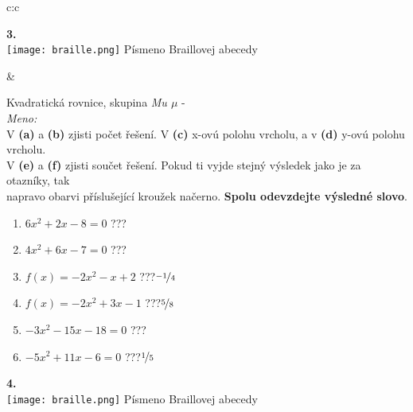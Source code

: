 \documentclass[10pt]{report}
\begin{document}
\begin{tabular}{c:c}
\begin{minipage}[c][99mm][t]{0.49\linewidth}
\begin{center}
\begin{minipage}{0.20\linewidth}
\begin{center}
{\Huge\bfseries 3.} \\[2mm]
\texttt{[image: braille.png]}
{\small Písmeno Braillovej abecedy}
\end{center}
\end{minipage}
\end{center}
\end{minipage}
&
\begin{minipage}[c][99mm][t]{0.49\linewidth}
\begin{center}
\vspace{7mm}
{\huge Kvadratická rovnice, skupina \textit{Mu $\mu$} -}\\[4.5mm]
\textit{Meno:}\phantom{xxxxxxxxxxxxxxxxxxxxxxxxxxxxxxxxxxxxxxxxxxxxxxxxxxxxxxxxxxxxxxxxx}\\[3.5mm]
V \textbf{(a)} a \textbf{(b)} zjisti počet řešení. V \textbf{(c)} x-ovú polohu vrcholu, a v \textbf{(d)} y-ovú polohu vrcholu.\\V \textbf{(e)} a \textbf{(f)} zjisti součet řešení. Pokud ti vyjde stejný výsledek jako je za otazníky, tak\\napravo obarvi příslušející kroužek načerno. \textbf{Spolu odevzdejte výsledné slovo}.\\[3mm]
\begin{minipage}{0.77\linewidth}
\begin{center}
\begin{varwidth}{\textwidth}
\begin{enumerate}
\large
\item $6x^2+2x-8=0$\quad \dotfill\; ???\;\dotfill {}
\item $4x^2+6x-7=0$\quad \dotfill\; ???\;\dotfill {}
\item $f(x)=-2x^2-x+2$\quad \dotfill\; ???\;\dotfill \quad $\nicefrac{-1}{4}$
\item $f(x)=-2x^2+3x-1$\quad \dotfill\; ???\;\dotfill \quad $\nicefrac{5}{8}$
\item $-3x^2-15x-18=0$\quad \dotfill\; ???\;\dotfill {}
\item $-5x^2+11x-6=0$\quad \dotfill\; ???\;\dotfill \quad $\nicefrac{1}{5}$
\end{enumerate}
\end{varwidth}
\end{center}
\end{minipage}
\begin{minipage}{0.20\linewidth}
\begin{center}
{\Huge\bfseries 4.} \\[2mm]
\texttt{[image: braille.png]}
{\small Písmeno Braillovej abecedy}
\end{center}
\end{minipage}
\end{center}
\end{minipage}

\end{tabular}
\end{document}
